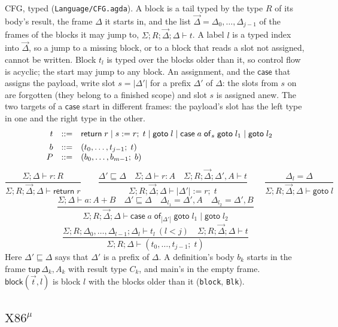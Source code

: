 \documentclass[10pt]{article}
\makeatletter
\theoremstyle{acmplain}
\newcommand{\key}[1]{\mathsf{#1}}
\newcommand{\assign}[3]{#1 \mathrel{:=} #2;\; #3}
\newcommand{\Treturn}[1]{\key{return}\;#1}
\newcommand{\Tgoto}[1]{\key{goto}\;#1}
\newcommand{\Tcase}[4]{\key{case}\;#1\;\key{of}_{#2}\;\key{goto}\;#3 \mid \key{goto}\;#4}
\newcommand{\Ml}[1]{\textrm{#1}^{\mu}}                  %
\newcommand{\Mtup}[1]{\key{tup}\,#1}                      %
\newenvironment{syntax}{\[\begin{array}{l@{\quad}rcl}}{\end{array}\]}
\makeatother
\begin{document}
CFG, typed (\texttt{Language/CFG.agda}). A block is a tail typed by the
type $R$ of its body's result, the frame $\Delta$ it starts in, and the
list $\vec{\Delta} = \Delta_0, \ldots, \Delta_{j-1}$ of the frames of the
blocks it may jump to, $\Sigma; R; \vec{\Delta}; \Delta \vdash t$. A label
$l$ is a typed index into $\vec{\Delta}$, so a jump to a missing block, or
to a block that reads a slot not assigned, cannot be written. Block $t_l$
is typed over the blocks older than it, so control flow is acyclic; the
start may jump to any block. An assignment, and the $\key{case}$ that
assigns the payload, write slot $s = |\Delta'|$ for a prefix $\Delta'$ of
$\Delta$: the slots from $s$ on are forgotten (they belong to a finished
scope) and slot $s$ is assigned anew. The two targets of a $\key{case}$
start in different frames: the payload's slot has the left type in one and
the right type in the other.
\begin{syntax}
  & t &::=& \Treturn{r} \mid \assign{s}{r}{t} \mid \Tgoto{l}
    \mid \Tcase{a}{s}{l_1}{l_2} \\[1ex]
  & b &::=& (t_0, \ldots, t_{j-1};\; t) \\
  & P &::=& (b_0, \ldots, b_{m-1};\; b)
\end{syntax}
\[
  \frac{\Sigma; \Delta \vdash r : R}{\Sigma; R; \vec{\Delta}; \Delta \vdash \Treturn{r}}
  \qquad
  \frac{\Delta' \sqsubseteq \Delta \quad \Sigma; \Delta \vdash r : A \quad
        \Sigma; R; \vec{\Delta}; \Delta', A \vdash t}
       {\Sigma; R; \vec{\Delta}; \Delta \vdash \assign{|\Delta'|}{r}{t}}
  \qquad
  \frac{\Delta_l = \Delta}{\Sigma; R; \vec{\Delta}; \Delta \vdash \Tgoto{l}}
\]
\[
  \frac{\Sigma; \Delta \vdash a : A + B \quad \Delta' \sqsubseteq \Delta \quad
        \Delta_{l_1} = \Delta', A \quad \Delta_{l_2} = \Delta', B}
       {\Sigma; R; \vec{\Delta}; \Delta \vdash
        \Tcase{a}{|\Delta'|}{l_1}{l_2}}
\]
\[
  \frac{\Sigma; R; \Delta_0, \ldots, \Delta_{l-1}; \Delta_l \vdash t_l \ (l < j) \quad
        \Sigma; R; \vec{\Delta}; \Delta \vdash t}
       {\Sigma; R; \Delta \vdash (t_0, \ldots, t_{j-1};\; t)}
\]
Here $\Delta' \sqsubseteq \Delta$ says that $\Delta'$ is a prefix of
$\Delta$. A definition's body $b_k$ starts in the frame
$\Mtup{\Delta_k}, A_k$ with result type $C_k$, and main's in the empty
frame. $\key{block}(\vec{t}, l)$ is block $l$ with the blocks older than it
(\texttt{block}, \texttt{Blk}).

\subsection{\texorpdfstring{$\Ml{X86}$}{X86-mu}}\label{sec:m-x86}
\end{document}
